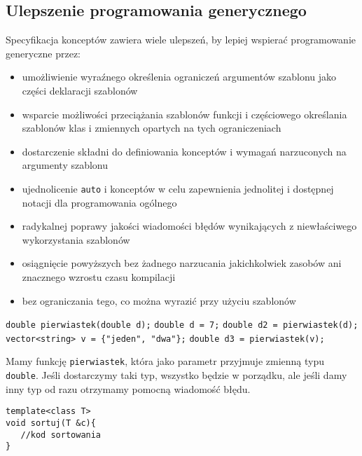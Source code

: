 \documentclass[11pt, a4paper]{article}
\begin{document}
\lstset{language=C++}

\subsection{Ulepszenie programowania generycznego}

Specyfikacja konceptów zawiera wiele ulepszeń, by lepiej wspierać programowanie generyczne przez:
\begin{itemize}

\item umożliwienie wyraźnego określenia ograniczeń argumentów szablonu jako części deklaracji szablonów
\item wsparcie możliwości przeciążania szablonów funkcji i częściowego określania szablonów klas i zmiennych opartych na tych ograniczeniach
\item dostarczenie składni do definiowania konceptów i wymagań narzuconych na argumenty szablonu
\item ujednolicenie \verb#auto# i konceptów w celu zapewnienia jednolitej i dostępnej notacji dla programowania ogólnego
\item radykalnej poprawy jakości wiadomości błędów wynikających z niewłaściwego wykorzystania szablonów
\item osiągnięcie powyższych bez żadnego narzucania jakichkolwiek zasobów ani znacznego wzrostu czasu kompilacji
\item bez ograniczania tego, co można wyrazić przy użyciu szablonów

\end{itemize}

\noindent\verb#double pierwiastek(double d);# \newline
\verb#double d = 7;# \newline
\verb#double d2 = pierwiastek(d);# \newline
\verb#vector<string> v = {"jeden", "dwa"};# \newline
\verb#double d3 = pierwiastek(v);# \newline

Mamy funkcję \verb#pierwiastek#, która jako parametr przyjmuje zmienną typu \verb#double#. Jeśli dostarczymy taki typ, wszystko będzie w porządku, ale jeśli damy inny typ od razu otrzymamy pomocną wiadomość błędu.

\begin{lstlisting}[frame=single]
template<class T>
void sortuj(T &c){
   //kod sortowania
}
\end{lstlisting}
\end{document}
